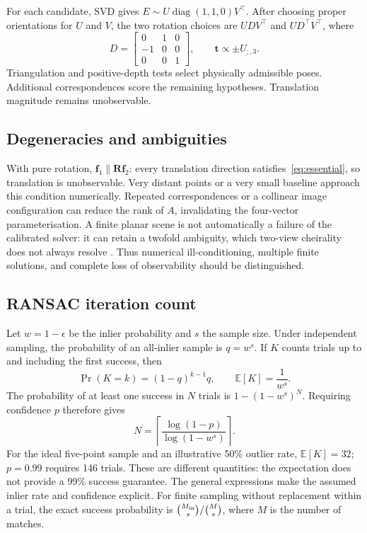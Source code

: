 \documentclass[10pt,a4paper,twocolumn]{article}
\newcommand{\R}{\mathbf R}
\newcommand{\ttt}{\mathbf t}
\newcommand{\ff}{\mathbf f}
\begin{document}
For each candidate, SVD gives $E\sim U\operatorname{diag}(1,1,0)V^\top$. After choosing proper orientations for $U$ and $V$, the two rotation choices are $UDV^\top$ and $UD^\top V^\top$, where
\begin{equation}
 D=\begin{bmatrix}0&1&0\\-1&0&0\\0&0&1\end{bmatrix},\qquad
 \ttt\propto\pm U_{:,3}.
\end{equation}
Triangulation and positive-depth tests select physically admissible poses. Additional correspondences score the remaining hypotheses. Translation magnitude remains unobservable.

\subsection{Degeneracies and ambiguities}
With pure rotation, $\ff_1\parallel\R\ff_2$: every translation direction satisfies~\eqref{eq:essential}, so translation is unobservable. Very distant points or a very small baseline approach this condition numerically. Repeated correspondences or a collinear image configuration can reduce the rank of $A$, invalidating the four-vector parameterisation. A finite planar scene is not automatically a failure of the calibrated solver: it can retain a twofold ambiguity, which two-view cheirality does not always resolve \cite{nister2003efficient}. Thus numerical ill-conditioning, multiple finite solutions, and complete loss of observability should be distinguished.

\subsection{RANSAC iteration count}
Let $w=1-\epsilon$ be the inlier probability and $s$ the sample size. Under independent sampling, the probability of an all-inlier sample is $q=w^s$. If $K$ counts trials up to and including the first success, then
\begin{equation}
 \Pr(K=k)=(1-q)^{k-1}q,\qquad
 \mathbb E[K]=\frac1{w^s}.
 \label{eq:expectation}
\end{equation}
The probability of at least one success in $N$ trials is $1-(1-w^s)^N$. Requiring confidence $p$ therefore gives
\begin{equation}
 N=\left\lceil\frac{\log(1-p)}{\log(1-w^s)}\right\rceil.
 \label{eq:confidence}
\end{equation}
For the ideal five-point sample and an illustrative 50\% outlier rate, $\mathbb E[K]=32$; $p=0.99$ requires 146 trials. These are different quantities: the expectation does not provide a 99\% success guarantee. The general expressions make the assumed inlier rate and confidence explicit. For finite sampling without replacement within a trial, the exact success probability is $\binom{M_{\rm in}}s/\binom Ms$, where $M$ is the number of matches.
\end{document}
